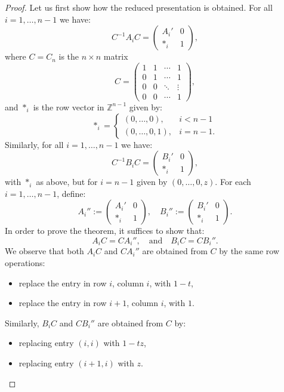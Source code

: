 \documentclass[10pt,a4paper]{amsart}
\begin{document}
\begin{proof}
Let us first show how the reduced presentation is obtained. For all $i = 1, \dots, n-1$ we have:
$$
C^{-1} A_i C =
\begin{pmatrix}
A_i' & 0 \\
\ast_i & 1
\end{pmatrix},
$$
where $C = C_n$ is the $n \times n$ matrix
$$
C =
\begin{pmatrix}
1 & 1 & \cdots & 1 \\
0 & 1 & \cdots & 1 \\
0 & 0 & \ddots & \vdots \\
0 & 0 & \cdots & 1
\end{pmatrix},
$$
and $\ast_i$ is the row vector in $\mathbb{Z}^{n-1}$ given by:
$$
\ast_i =
\begin{cases}
(0, \dots, 0), & i < n-1 \\
(0, \dots, 0, 1), & i = n-1.
\end{cases}
$$
Similarly, for all $i = 1, \dots, n-1$ we have:
$$
C^{-1} B_i C =
\begin{pmatrix}
B_i' & 0 \\
\ast_i & 1
\end{pmatrix},
$$
with $\ast_i$ as above, but for $i = n-1$ given by $(0, \dots, 0, z)$. For each $i = 1, \dots, n-1$, define:
$$
A_i'' :=
\begin{pmatrix}
A_i' & 0 \\
\ast_i & 1
\end{pmatrix},
\quad
B_i'' :=
\begin{pmatrix}
B_i' & 0 \\
\ast_i & 1
\end{pmatrix}.
$$
In order to prove the theorem, it suffices to show that:
$$
A_i C = C A_i'', \quad \text{and} \quad B_i C = C B_i''.
$$
We observe that both $A_i C$ and $C A_i''$ are obtained from $C$ by the same row operations:
\begin{itemize}
    \item replace the entry in row $i$, column $i$, with $1 - t$,
    \item replace the entry in row $i+1$, column $i$, with $1$.
\end{itemize}
Similarly, $B_i C$ and $C B_i''$ are obtained from $C$ by:
\begin{itemize}
    \item replacing entry $(i,i)$ with $1 - tz$,
    \item replacing entry $(i+1,i)$ with $z$.
\end{itemize}


\end{proof}
\end{document}
